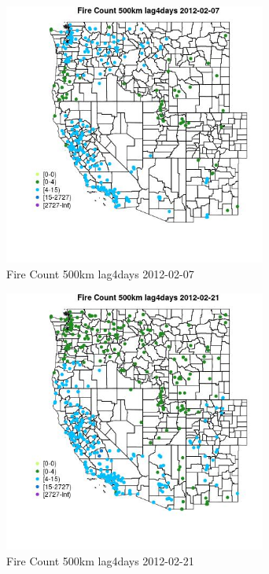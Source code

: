 \begin{figure} 
\centering  
\includegraphics[width=0.77\textwidth]{Code_Outputs/Report_ML_input_PM25_Step4_part_f_de_duplicated_aves_prioritize_24hr_obswNAs_MapObsFire_Count_500km_lag4days2012-02-07.jpg} 
\caption{\label{fig:Report_ML_input_PM25_Step4_part_f_de_duplicated_aves_prioritize_24hr_obswNAsMapObsFire_Count_500km_lag4days2012-02-07}Fire Count 500km lag4days 2012-02-07} 
\end{figure} 
 

\begin{figure} 
\centering  
\includegraphics[width=0.77\textwidth]{Code_Outputs/Report_ML_input_PM25_Step4_part_f_de_duplicated_aves_prioritize_24hr_obswNAs_MapObsFire_Count_500km_lag4days2012-02-21.jpg} 
\caption{\label{fig:Report_ML_input_PM25_Step4_part_f_de_duplicated_aves_prioritize_24hr_obswNAsMapObsFire_Count_500km_lag4days2012-02-21}Fire Count 500km lag4days 2012-02-21} 
\end{figure} 
 

